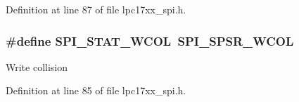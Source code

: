 \-Definition at line 87 of file lpc17xx\-\_\-spi.\-h.

\hypertarget{group___s_p_i___public___macros_ga90462f910bfc8a146d0de70c71f09631}{
\subsubsection[{\-S\-P\-I\-\_\-\-S\-T\-A\-T\-\_\-\-W\-C\-O\-L}]{\setlength{\rightskip}{0pt plus 5cm}\#define {\bf \-S\-P\-I\-\_\-\-S\-T\-A\-T\-\_\-\-W\-C\-O\-L}~{\bf \-S\-P\-I\-\_\-\-S\-P\-S\-R\-\_\-\-W\-C\-O\-L}}}\label{group___s_p_i___public___macros_ga90462f910bfc8a146d0de70c71f09631}
\-Write collision 

\-Definition at line 85 of file lpc17xx\-\_\-spi.\-h.

